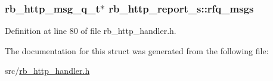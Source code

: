 \subsubsection[{rfq\+\_\+msgs}]{\setlength{\rightskip}{0pt plus 5cm}rb\+\_\+http\+\_\+msg\+\_\+q\+\_\+t$\ast$ rb\+\_\+http\+\_\+report\+\_\+s\+::rfq\+\_\+msgs}\label{structrb__http__report__s_a7752d311c68a4f7019eebb162cb72553}


Definition at line 80 of file rb\+\_\+http\+\_\+handler.\+h.



The documentation for this struct was generated from the following file\+:\begin{DoxyCompactItemize}
\item 
src/\hyperlink{rb__http__handler_8h}{rb\+\_\+http\+\_\+handler.\+h}\end{DoxyCompactItemize}
